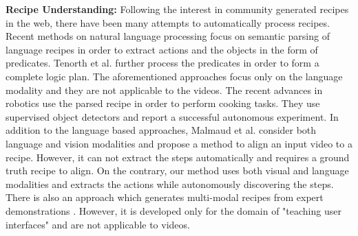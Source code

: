 \noindent\textbf{Recipe Understanding:}
Following the interest in community generated recipes in the web, there have been many attempts to automatically process recipes. Recent methods on natural language processing \cite{cookingSemantics,logicRecipe} focus on semantic parsing of language recipes in order to extract actions and the objects in the form of predicates. Tenorth et al.\cite{logicRecipe} further process the predicates in order to form a complete logic plan. The aforementioned approaches focus only on the language modality and they are not applicable to the videos. The recent advances \cite{beetz,cookie} in robotics use the parsed recipe in order to perform cooking tasks. They use supervised object detectors and report a successful autonomous experiment. In addition to the language based approaches, Malmaud et al.\cite{alignment} consider both language and vision modalities and propose a method to align an input video to a recipe. However, it can not extract the steps automatically and requires a ground truth recipe to align. On the contrary, our method uses both visual and language modalities and extracts the actions while autonomously discovering the steps. There is also an approach which generates multi-modal recipes from expert demonstrations \cite{photoshop}. However, it is developed only for the domain of "teaching user interfaces" and are not applicable to videos.
